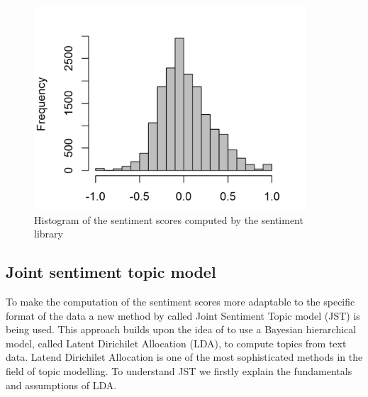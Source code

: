 \begin{figure}[h]
\centering
\includegraphics[width=4in]{figures/2SentimentsBOW_Histogram.png}
\caption{Histogram of the sentiment scores computed by the sentiment library}
\label{fig:BoWSentiment}
\end{figure}



\subsection{Joint sentiment topic model}\label{JST}
To make the computation of the sentiment scores more adaptable to the specific format of the data a new method by \citet{lin2009joint} called Joint Sentiment Topic model (JST) is being used. This approach builds upon the idea of \citet{blei2003latent} to use a Bayesian hierarchical model, called Latent Dirichilet Allocation (LDA), to compute topics from text data. Latend Dirichilet Allocation is one of the most sophisticated methods in the field of topic modelling. To understand JST we firstly explain the fundamentals and assumptions of LDA. \\ 

